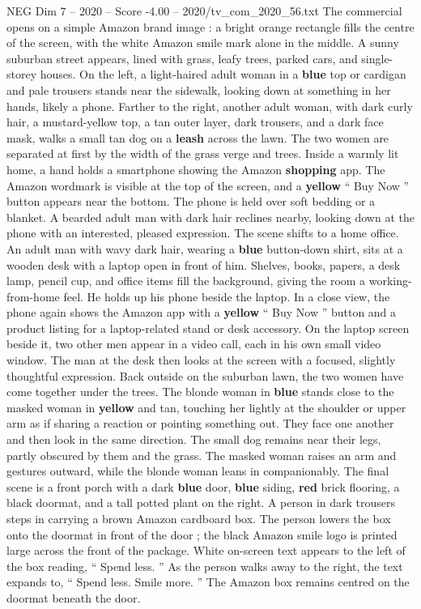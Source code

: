 \begin{textsample}{NEG Dim 7 – 2020 – Score -4.00 – 2020/tv\_com\_2020\_56.txt}  \label{ex:f7_neg_010}
The commercial opens on a simple Amazon brand image : a bright orange rectangle fills the centre of the screen, with the white Amazon smile mark alone in the middle.
A sunny suburban street appears, lined with grass, leafy trees, parked cars, and single-storey houses.
On the left, a light-haired adult woman in a \textbf{blue} top or cardigan and pale trousers stands near the sidewalk, looking down at something in her hands, likely a phone.
Farther to the right, another adult woman, with dark curly hair, a mustard-yellow top, a tan outer layer, dark trousers, and a dark face mask, walks a small tan dog on a \textbf{leash} across the lawn.
The two women are separated at first by the width of the grass verge and trees.
Inside a warmly lit home, a hand holds a smartphone showing the Amazon \textbf{shopping} app.
The Amazon wordmark is visible at the top of the screen, and a \textbf{yellow} “ Buy Now ” button appears near the bottom.
The phone is held over soft bedding or a blanket.
A bearded adult man with dark hair reclines nearby, looking down at the phone with an interested, pleased expression.
The scene shifts to a home office.
An adult man with wavy dark hair, wearing a \textbf{blue} button-down shirt, sits at a wooden desk with a laptop open in front of him.
Shelves, books, papers, a desk lamp, pencil cup, and office items fill the background, giving the room a working-from-home feel.
He holds up his phone beside the laptop.
In a close view, the phone again shows the Amazon app with a \textbf{yellow} “ Buy Now ” button and a product listing for a laptop-related stand or desk accessory.
On the laptop screen beside it, two other men appear in a video call, each in his own small video window.
The man at the desk then looks at the screen with a focused, slightly thoughtful expression.
Back outside on the suburban lawn, the two women have come together under the trees.
The blonde woman in \textbf{blue} stands close to the masked woman in \textbf{yellow} and tan, touching her lightly at the shoulder or upper arm as if sharing a reaction or pointing something out.
They face one another and then look in the same direction.
The small dog remains near their legs, partly obscured by them and the grass.
The masked woman raises an arm and gestures outward, while the blonde woman leans in companionably.
The final scene is a front porch with a dark \textbf{blue} door, \textbf{blue} siding, \textbf{red} brick flooring, a black doormat, and a tall potted plant on the right.
A person in dark trousers steps in carrying a brown Amazon cardboard box.
The person lowers the box onto the doormat in front of the door ; the black Amazon smile logo is printed large across the front of the package.
White on-screen text appears to the left of the box reading, “ Spend less. ” As the person walks away to the right, the text expands to, “ Spend less.
Smile more. ” The Amazon box remains centred on the doormat beneath the door.

\end{textsample}
